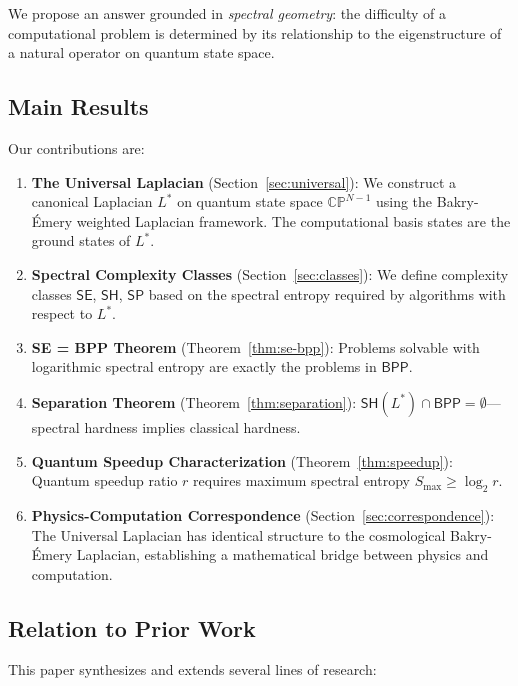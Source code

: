 \documentclass[11pt,a4paper]{article}
\theoremstyle{plain}
\theoremstyle{definition}
\theoremstyle{remark}
\newcommand{\CP}{\mathbb{CP}}
\newcommand{\BPP}{\mathsf{BPP}}
\newcommand{\SE}{\mathsf{SE}}
\newcommand{\SH}{\mathsf{SH}}
\newcommand{\SP}{\mathsf{SP}}
\begin{document}
We propose an answer grounded in \emph{spectral geometry}: the difficulty of a computational problem is determined by its relationship to the eigenstructure of a natural operator on quantum state space.

\subsection{Main Results}

Our contributions are:

\begin{enumerate}[label=(\roman*),noitemsep]
    \item \textbf{The Universal Laplacian} (Section~\ref{sec:universal}): We construct a canonical Laplacian $L^*$ on quantum state space $\CP^{N-1}$ using the Bakry-\'Emery weighted Laplacian framework. The computational basis states are the ground states of $L^*$.

    \item \textbf{Spectral Complexity Classes} (Section~\ref{sec:classes}): We define complexity classes $\SE$, $\SH$, $\SP$ based on the spectral entropy required by algorithms with respect to $L^*$.

    \item \textbf{SE = BPP Theorem} (Theorem~\ref{thm:se-bpp}): Problems solvable with logarithmic spectral entropy are exactly the problems in $\BPP$.

    \item \textbf{Separation Theorem} (Theorem~\ref{thm:separation}): $\SH(L^*) \cap \BPP = \emptyset$---spectral hardness implies classical hardness.

    \item \textbf{Quantum Speedup Characterization} (Theorem~\ref{thm:speedup}): Quantum speedup ratio $r$ requires maximum spectral entropy $S_{\max} \geq \log_2 r$.

    \item \textbf{Physics-Computation Correspondence} (Section~\ref{sec:correspondence}): The Universal Laplacian has identical structure to the cosmological Bakry-\'Emery Laplacian, establishing a mathematical bridge between physics and computation.
\end{enumerate}

\subsection{Relation to Prior Work}

This paper synthesizes and extends several lines of research:
\end{document}
